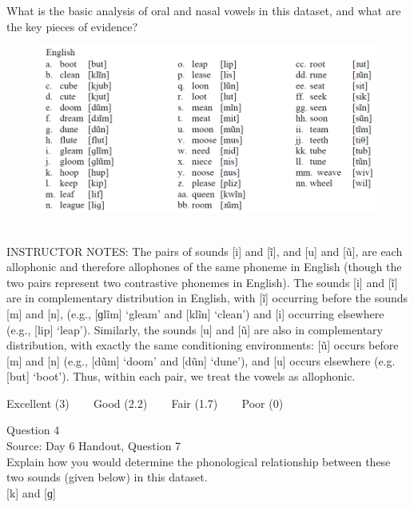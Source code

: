 \documentclass[12pt]{article}
\begin{document}
What is the basic analysis of oral and nasal vowels in this dataset, and what are the key pieces of evidence?\\

\begin{figure}[H]
\includegraphics{../images/english12.png}
\end{figure}

~\\
INSTRUCTOR NOTES: The pairs of sounds [i] and [ĩ], and [u] and [ũ], are each allophonic and therefore allophones of the same phoneme in English (though the two pairs represent two contrastive phonemes in English). The sounds [i] and [ĩ] are in complementary distribution in English, with [ĩ] occurring before the sounds [m] and [n], (e.g., [ɡlĩm] ‘gleam’ and [klĩn] ‘clean’) and [i] occurring elsewhere (e.g., [lip] ‘leap’). Similarly, the sounds [u] and [ũ] are also in complementary distribution, with exactly the same conditioning environments: [ũ] occurs before [m] and [n] (e.g., [dũm] ‘doom’ and [dũn] ‘dune’), and [u] occurs elsewhere (e.g. [but] ‘boot’). Thus, within each pair, we treat the vowels as allophonic. 


\vfill
Excellent (3) ~~~ Good (2.2) ~~~ Fair (1.7) ~~~ Poor (0)
\newpage

{\large Question 4}\\

Source: Day 6 Handout, Question 7\\

Explain how you would determine the phonological relationship between these two sounds (given below) in this dataset.\\

{[k]} and {[ɡ]}
\end{document}
